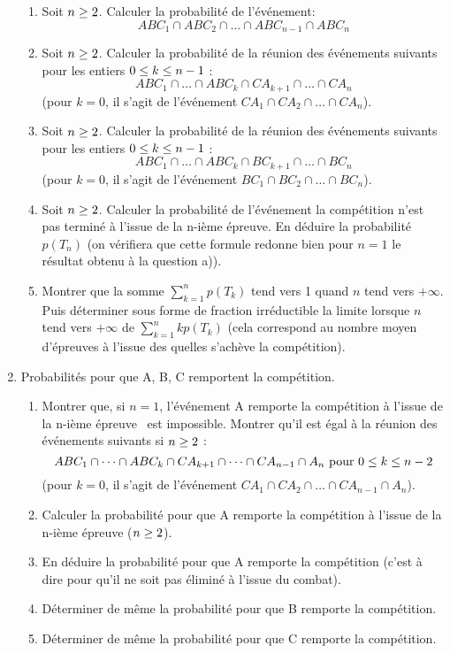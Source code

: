 \begin{enumerate}
\begin{enumerate}
\item Soit $n \geq 2$. Calculer la probabilité de l'événement:
$$ABC_1 \cap ABC_2 \cap \dots \cap ABC_{n-1} \cap ABC_n$$

\item Soit $n \geq 2$. Calculer la probabilité de la réunion des événements suivants pour les entiers
$0 \leq k \leq n - 1$ :
$$ABC_1 \cap \dots \cap ABC_k \cap CA_{k+1} \cap \dots \cap CA_n$$
(pour $k = 0$, il s'agit de l'événement $CA_1 \cap CA_2 \cap \dots \cap CA_n$).

\item Soit $n \geq 2$. Calculer la probabilité de la réunion des événements suivants pour les entiers
$0 \leq k \leq n - 1$ :
$$ABC_1 \cap \dots \cap ABC_k \cap BC_{k+1} \cap \dots \cap BC_n$$
(pour $k = 0$, il s'agit de l'événement $BC_1 \cap BC_2 \cap \dots \cap BC_n$).

\item Soit $n \geq2$. Calculer la probabilité de l'événement  \og la compétition n'est pas terminé à l'issue
de la n-ième épreuve\fg. En déduire la probabilité $p(T_n)$ (on vérifiera que cette formule redonne bien pour $n = 1$ le résultat obtenu à la question a)).

\item Montrer que  la somme  $\sum_{k=1}^np(T_ k)$  tend vers 1 quand $n$ tend vers $+\infty$. Puis
déterminer sous forme de fraction irréductible la limite lorsque $n$ tend vers $+\infty$ de $\sum_{k=1}^nkp(T_ k)$ (cela correspond au nombre moyen d'épreuves à l'issue des quelles s'achève la compétition).
\end{enumerate}

\item Probabilités pour que A, B, C remportent la compétition.
\begin{enumerate}
\item Montrer que, si $n = 1$, l'événement 
\og A remporte la compétition à l'issue de la n-ième épreuve\fg~ est impossible. Montrer qu'il est égal à la réunion des événements suivants si $n \geq 2$ :
\begin{displaymath}
ABC_1 \cap \dots \cap ABC_k \cap CA_{k+1} \cap \dots \cap CA_{n-1} \cap A_n \text{ pour }  0 \leq k \leq n - 2
\end{displaymath}
(pour $k = 0$, il s'agit de l'événement $CA_1 \cap CA_2 \cap \dots \cap CA_{n-1} \cap A_n$).
\item Calculer la probabilité pour que A remporte la compétition à l'issue de la n-ième épreuve ($n \geq 2$).
\item En déduire la probabilité pour que A remporte la compétition (c'est à dire pour qu'il ne soit pas
éliminé à l'issue du combat).
\item Déterminer de même la probabilité pour que B remporte la compétition.
\item Déterminer de même la probabilité pour que C remporte la compétition.
\end{enumerate}
\end{enumerate}


